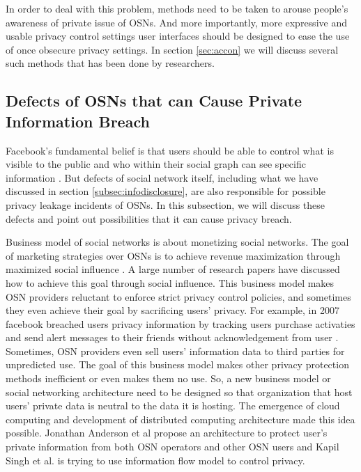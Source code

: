 \documentclass[12pt]{article}
\begin{document}
In order to deal with this problem, methods need to be taken to arouse
people's awareness of private issue of OSNs. And more importantly,
more expressive and usable privacy control settings user interfaces
should be designed to ease the use of once obsecure privacy
settings. In section \ref{sec:accon} we will discuss several such
methods that has been done by researchers. 


\subsection{Defects of OSNs that can Cause Private Information
  Breach \label{subsec:OSNDefects}}
Facebook’s fundamental belief is that users should be able to control
what is visible to the public and who within their social graph can
see specific information \cite{granular-privacy-control}. But defects
of social network itself, including what we have discussed in section
\ref{subsec:infodisclosure}, are also responsible for possible privacy
leakage incidents of OSNs. In this subsection, we will discuss these
defects and point out possibilities that it can cause privacy breach.

Business model \cite{business-model} of social networks is about
monetizing social networks. The goal of marketing strategies over OSNs
is to achieve revenue maximization through maximized social influence
\cite{SN-marketing}. A large number of research papers
\cite{max-revenue-single-sample} \cite{SN-marketing-candidate} have
discussed how to achieve this goal through social influence. This
business model makes OSN providers reluctant to enforce strict privacy
control policies, and sometimes they even achieve their goal by
sacrificing users' privacy. For example, in 2007 facebook breached
users privacy information by tracking users purchase activaties and
send alert messages to their friends without acknowledgement from user
\cite{social-networking-report-economist}. Sometimes, OSN providers
even sell users' information data to third parties for unpredicted
use. The goal of this business model makes other privacy protection
methods inefficient or even makes them no use. So, a new business
model or social networking architecture need to be designed so that
organization that host users' private data is neutral to the data it
is hosting. The emergence of cloud computing\cite{cloud-computing} and
development of distributed computing architecture made this idea
possible. Jonathan Anderson et al propose an architecture to protect
user's private information from both OSN operators and other OSN
users\cite{privacy-SN-untrusted-networks} and Kapil Singh et al. is
trying to use information flow model to control
privacy\cite{xbook-social-platform}. 
\end{document}
